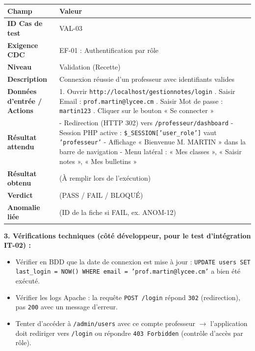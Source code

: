 \documentclass[11pt]{article}
\begin{document}
\begin{exoresolu}
\begin{center}
\begin{tabularx}{\linewidth}{|l|X|}
\hline
\rowcolor{popblueL}
\textbf{Champ} & \textbf{Valeur} \\
\hline
\textbf{ID Cas de test} & VAL-03 \\
\hline
\textbf{Exigence CDC} & EF-01 : Authentification par rôle \\
\hline
\textbf{Niveau} & Validation (Recette) \\
\hline
\textbf{Description} & Connexion réussie d'un professeur avec identifiants valides \\
\hline
\textbf{Données d'entrée / Actions} &
1. Ouvrir \texttt{http://localhost/gestionnotes/login} \newline
2. Saisir Email : \texttt{prof.martin@lycee.cm} \newline
3. Saisir Mot de passe : \texttt{martin123} \newline
4. Cliquer sur le bouton « Se connecter » \\
\hline
\textbf{Résultat attendu} &
- Redirection (HTTP 302) vers \texttt{/professeur/dashboard} \newline
- Session PHP active : \texttt{\$\_SESSION['user\_role']} vaut \texttt{'professeur'} \newline
- Affichage « Bienvenue M. MARTIN » dans la barre de navigation \newline
- Menu latéral : « Mes classes », « Saisir notes », « Mes bulletins » \\
\hline
\textbf{Résultat obtenu} & (À remplir lors de l'exécution) \\
\hline
\textbf{Verdict} & (PASS / FAIL / BLOQUÉ) \\
\hline
\textbf{Anomalie liée} & (ID de la fiche si FAIL, ex. ANOM-12) \\
\hline
\end{tabularx}
\end{center}

\noindent\textbf{3. Vérifications techniques (côté développeur, pour le test d'intégration IT-02) :}
\begin{itemize}
    \item Vérifier en BDD que la date de connexion est mise à jour : \texttt{UPDATE users SET last\_login = NOW() WHERE email = 'prof.martin@lycee.cm'} a bien été exécuté.
    \item Vérifier les logs Apache : la requête \texttt{POST /login} répond \texttt{302} (redirection), pas \texttt{200} avec un message d'erreur.
    \item Tenter d'accéder à \texttt{/admin/users} avec ce compte professeur $\rightarrow$ l'application doit rediriger vers \texttt{/login} ou répondre \texttt{403 Forbidden} (contrôle d'accès par rôle).
\end{itemize}
\end{exoresolu}
\end{document}
